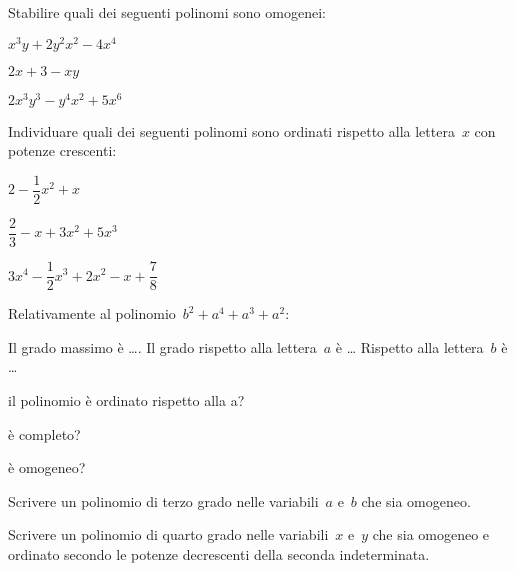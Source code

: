 \begin{multicols}{2}
\begin{esercizio}
\label{ese:10.3}
Stabilire quali dei seguenti polinomi sono omogenei:

\begin{enumeratea}
\item \(x^3y+2y^2x^2-4x^4\)
\item \(2x+3-xy\)
\item \(2x^3y^3-y^4x^2+5x^6\)
\end{enumeratea}
\end{esercizio}

\begin{esercizio}
\label{ese:10.4}
Individuare quali dei seguenti polinomi sono ordinati rispetto alla lettera~\(x\) 
con potenze crescenti:

\begin{enumeratea}
\item \(2-\dfrac{1}{2}x^2+x\)
\item \(\dfrac{2}{3}-x+3x^2+5x^3\)
\item \(3x^4-\dfrac{1}{2}x^3+2x^2-x+\dfrac{7}{8}\)
\end{enumeratea}
\end{esercizio}

\begin{esercizio}
\label{ese:10.5}
Relativamente al polinomio~\(b^2+a^4+a^3+a^2\):
\begin{itemize*}
\item Il grado massimo è \ldots. Il grado rispetto alla lettera~\(a\) è \ldots 
Rispetto alla lettera~\(b\) è \ldots
\item il polinomio è ordinato rispetto alla a? %
\item è completo? %
\item è omogeneo? %
\end{itemize*}
\end{esercizio}

\begin{esercizio}
\label{ese:10.6}
Scrivere un polinomio di terzo grado nelle variabili~\(a\) e~\(b\) che sia omogeneo.
\end{esercizio}

\begin{esercizio}
\label{ese:10.7}
Scrivere un polinomio di quarto grado nelle variabili~\(x\) e~\(y\) che sia omogeneo 
e ordinato secondo le
potenze decrescenti della seconda indeterminata.
\end{esercizio}


\end{multicols}
